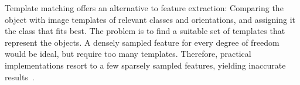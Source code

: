 



 







%


Template matching offers an alternative to feature extraction: Comparing the object with image templates of relevant classes and orientations, and assigning it the class that fits best. The problem is to find a suitable set of templates that represent the objects. A densely sampled feature for every degree of freedom would be ideal, but require too many templates. Therefore, practical implementations resort to a few sparsely sampled features, yielding inaccurate results~\cite{Midelfart2010}.

%
%
%
%

